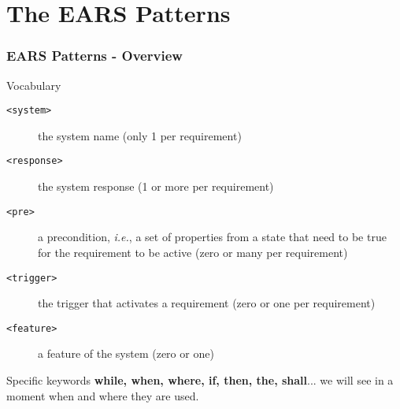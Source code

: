 \documentclass[aspectratio=169]{beamer}
\begin{document}
\section*{The EARS Patterns}
%
%
%
\begin{frame}
  \frametitle{EARS Patterns - Overview}
  \begin{block}{Vocabulary}
    \small
    \begin{description}
      \item [\texttt{<system>}] the system name (only 1 per requirement)
      \item [\texttt{<response>}] the system response (1 or more per requirement)
      \item [\texttt{<pre>}] a precondition, {\em i.e.}, a set of properties from a state that need to be true for the requirement to be active (zero or many per requirement)
      \item [\texttt{<trigger>}] the trigger that activates a requirement (zero or one per requirement)
      \item [\texttt{<feature>}] a feature of the system (zero or one)
    \end{description}
  \end{block}
  \begin{block}{Specific keywords}
  {\bf while, when, where, if, then, the, shall}... we will see in a moment when and where they are used.
  \end{block}

\end{frame}
\end{document}
